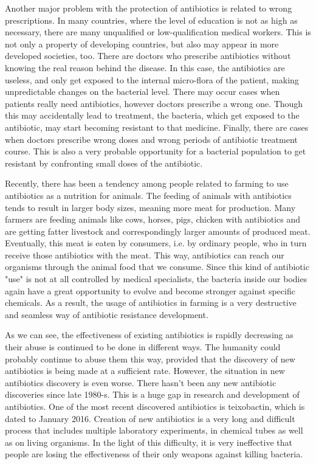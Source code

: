 Another major problem with the protection of antibiotics is related to wrong prescriptions. In many countries, where the level of education is not as high as necessary, there are many unqualified or low-qualification medical workers. This is not only a property of developing countries, but also may appear in more developed societies, too. There are doctors who prescribe antibiotics without knowing the real reason behind the disease. In this case, the antibiotics are useless, and only get exposed to the internal micro-flora of the patient, making unpredictable changes on the bacterial level. There may occur cases when patients really need antibiotics, however doctors prescribe a wrong one. Though this may accidentally lead to treatment, the bacteria, which get exposed to the antibiotic, may start becoming resistant to that medicine. Finally, there are cases when doctors prescribe wrong doses and wrong periods of antibiotic treatment course. This is also a very probable opportunity for a bacterial population to get resistant by confronting small doses of the antibiotic.

Recently, there has been a tendency among people related to farming to use antibiotics as a nutrition for animals. The feeding of animals with antibiotics tends to result in larger body sizes, meaning more meat for production. Many farmers are feeding animals like cows, horses, pigs, chicken with antibiotics and are getting fatter livestock and correspondingly larger amounts of produced meat. Eventually, this meat is eaten by consumers, i.e. by ordinary people, who in turn receive those antibiotics with the meat. This way, antibiotics can reach our organisms through the animal food that we consume. Since this kind of antibiotic "use" is not at all controlled by medical specialists, the bacteria inside our bodies again have a great opportunity to evolve and become stronger against specific chemicals. As a result, the usage of antibiotics in farming is a very destructive and seamless way of antibiotic resistance development.

As we can see, the effectiveness of existing antibiotics is rapidly decreasing as their abuse is continued to be done in different ways. The humanity could probably continue to abuse them this way, provided that the discovery of new antibiotics is being made at a sufficient rate. However, the situation in new antibiotics discovery is even worse. There hasn't been any new antibiotic discoveries since late 1980-s. This is a huge gap in research and development of antibiotics. One of the most recent discovered antibiotics is teixobactin, which is dated to January 2016. Creation of new antibiotics is a very long and difficult process that includes multiple laboratory experiments, in chemical tubes as well as on living organisms. In the light of this difficulty, it is very ineffective that people are losing the effectiveness of their only weapons against killing bacteria.

